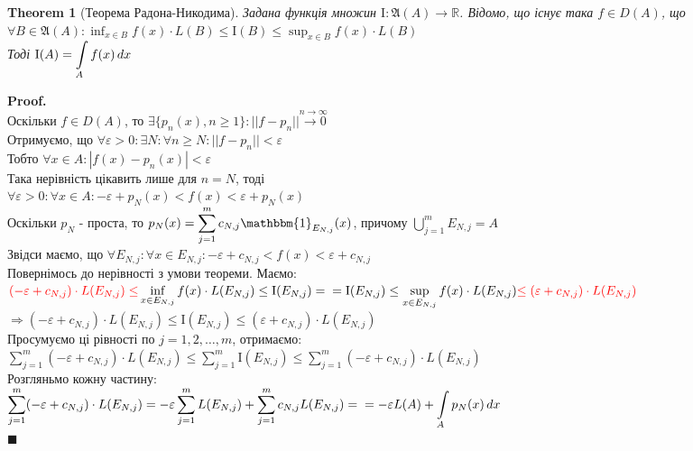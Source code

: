 \documentclass[a4paper, 14pt]{extarticle}
\def\huge{\displaystyle}
\theoremstyle{theoremdd}
\newtheorem{theorem}{Theorem}[subsection]
\theoremstyle{theoremdd}
\theoremstyle{theoremdd}
\theoremstyle{theoremdd}
\theoremstyle{theoremdd}
\theoremstyle{theoremdd}
\theoremstyle{theoremdd}
\theoremstyle{theoremdd}
\newenvironment{pf}{\vspace*{-3mm} \textbf{Proof. \\}}{$\blacksquare$}
\begin{document}
\begin{theorem}[Теорема Радона-Никодима]
Задана функція множин $\mathrm{I}: \mathfrak{A}(A) \to \mathbb{R}$. Відомо, що існує така $f \in D(A)$, що\\
$\forall B \in \mathfrak{A}(A): \huge \inf_{x \in B}f(x) \cdot L(B) \leq \mathrm{I}(B) \leq \sup_{x \in B} f(x) \cdot L(B)$\\
Тоді $\huge \mathrm{I}(A) = \int\displaylimits_A f(x)\,dx$
\end{theorem}

\begin{pf}
Оскільки $f \in D(A)$, то $\exists \{p_n(x), n \geq 1\}: ||f-p_n|| \overset{n \to \infty}{\longrightarrow 0}$\\
Отримуємо, що $\forall \varepsilon > 0: \exists N: \forall n \geq N: ||f-p_n|| < \varepsilon$\\
Тобто $\forall x \in A: |f(x) - p_n(x)| < \varepsilon$\\
Така нерівність цікавить лише для $n = N$, тоді\\
$\forall \varepsilon > 0: \forall x \in A: -\varepsilon+p_N(x) < f(x) < \varepsilon+p_N(x)$\\
Оскільки $p_N$ - проста, то $p_N(x) = \huge \sum_{j=1}^m c_{N,j} \mathbbm{1}_{E_{N,j}}(x)$, причому $\huge \bigcup_{j=1}^m E_{N,j} = A$\\
Звідси маємо, що $\forall E_{N,j}: \forall x \in E_{N,j}: -\varepsilon + c_{N,j} < f(x) < \varepsilon + c_{N,j}$\\
Повернімось до нерівності з умови теореми. Маємо:\\
$\huge \textcolor{red}{(-\varepsilon+c_{N,j}) \cdot L(E_{N,j}) \leq} \inf_{x \in E_{N,j}}f(x) \cdot L(E_{N,j}) \leq \mathrm{I}(E_{N,j}) = \\ = \mathrm{I}(E_{N,j}) \leq \sup_{x \in E_{N,j}} f(x) \cdot L(E_{N,j}) \textcolor{red}{\leq (\varepsilon + c_{N,j}) \cdot L(E_{N,j})}$\\
$\Rightarrow (-\varepsilon+c_{N,j}) \cdot L(E_{N,j}) \leq \mathrm{I}(E_{N,j}) \leq (\varepsilon + c_{N,j}) \cdot L(E_{N,j})$\\
Просумуємо ці рівності по $j =1,2,\dots,m$, отримаємо:\\
$\huge \sum_{j=1}^m (-\varepsilon + c_{N,j}) \cdot L(E_{N,j}) \leq \sum_{j=1}^m \mathrm{I}(E_{N,j}) \leq \sum_{j=1}^m (-\varepsilon + c_{N,j}) \cdot L(E_{N,j})$\\
Розгляньмо кожну частину:\\
$\huge \sum_{j=1}^m (-\varepsilon + c_{N,j}) \cdot L(E_{N,j}) = -\varepsilon \sum_{j=1}^m L(E_{N,j}) + \sum_{j=1}^m c_{N,j} L(E_{N,j}) = \\ = -\varepsilon L(A) + \int\displaylimits_A p_N(x) \,dx$\\

\end{pf}
\end{document}
